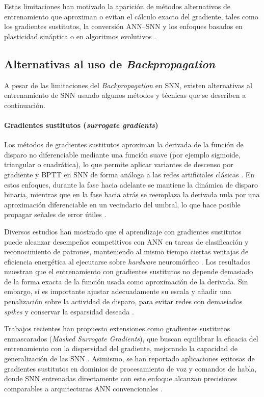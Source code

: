 Estas limitaciones han motivado la aparición de métodos alternativos de entrenamiento que aproximan o evitan el cálculo exacto del gradiente, tales como los gradientes sustitutos, la conversión ANN–SNN y los enfoques basados en plasticidad sináptica o en algoritmos evolutivos \cite{Shen2024EvolutionarySNN, Schuman2022Opportunities}.

\subsection{Alternativas al uso de \textit{Backpropagation}}
A pesar de las limitaciones del \textit{Backpropagation} en SNN, existen alternativas al entrenamiento de SNN usando algunos métodos y técnicas que se describen a continuación.

\paragraph{Gradientes sustitutos (\textit{surrogate gradients})}
Los métodos de gradientes sustitutos aproximan la derivada de la función de disparo no diferenciable mediante una función suave (por ejemplo sigmoide, triangular o cuadrática), lo que permite aplicar variantes de descenso por gradiente y BPTT en SNN de forma análoga a las redes artificiales clásicas \cite{Zenke2021surrogatesnn}. En estos enfoques, durante la fase hacia adelante se mantiene la dinámica de disparo binaria, mientras que en la fase hacia atrás se reemplaza la derivada nula por una aproximación diferenciable en un vecindario del umbral, lo que hace posible propagar señales de error útiles \cite{Neftci2019SurrogateGradient}.

Diversos estudios han mostrado que el aprendizaje con gradientes sustitutos puede alcanzar desempeños competitivos con ANN en tareas de clasificación y reconocimiento de patrones, manteniendo al mismo tiempo ciertas ventajas de eficiencia energética al ejecutarse sobre \textit{hardware} neuromórfico \cite{Zenke2021surrogatesnn, Schuman2022Opportunities}. Los resultados muestran que el entrenamiento con gradientes sustitutos no depende demasiado de la forma exacta de la función usada como aproximación de la derivada. Sin embargo, sí es importante ajustar adecuadamente su escala y añadir una penalización sobre la actividad de disparo, para evitar redes con demasiados \textit{spikes} y conservar la esparsidad deseada \cite{Li2024snnsparsesurrogate}.

Trabajos recientes han propuesto extensiones como gradientes sustitutos enmascarados (\textit{Masked Surrogate Gradients}), que buscan equilibrar la eficacia del entrenamiento con la dispersidad del gradiente, mejorando la capacidad de generalización de las SNN \cite{Li2024snnsparsesurrogate}. Asimismo, se han reportado aplicaciones exitosas de gradientes sustitutos en dominios de procesamiento de voz y comandos de habla, donde SNN entrenadas directamente con este enfoque alcanzan precisiones comparables a arquitecturas ANN convencionales \cite{Bittar2022surrogatespiking}.


